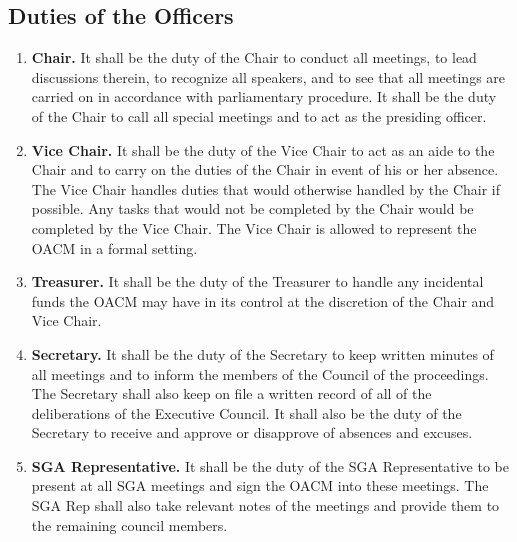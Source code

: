 \documentclass[letterpaper, 12pt]{article}
\begin{document}
\subsection{Duties of the Officers}
\begin{enumerate}
    \item \textbf{Chair.}  It shall be the duty of the Chair to conduct all 
        meetings, to lead discussions therein, to recognize all speakers, 
        and to see that all meetings are carried on in accordance with 
        parliamentary procedure.  
        It shall be the duty of the Chair to call all special meetings 
        and to act as the presiding officer.
    \item \textbf{Vice Chair.} It shall be the duty of the Vice Chair to act 
        as an aide to the Chair and to carry on the duties of the Chair in 
        event of his or her absence.  
        The Vice Chair handles duties that would otherwise handled by the 
        Chair if possible. 
        Any tasks that would not be completed by the Chair would be completed 
        by the Vice Chair. 
        The Vice Chair is allowed to represent the OACM in a formal setting.
    \item \textbf{Treasurer.} It shall be the duty of the Treasurer to 
        handle any incidental funds the OACM may have in its control at the 
        discretion of the Chair and Vice Chair.
    \item \textbf{Secretary.} It shall be the duty of the Secretary to keep 
        written minutes of all meetings and to inform the members of the 
        Council of the proceedings.  
        The Secretary shall also keep on file a written record of all of the 
        deliberations of the Executive Council.  
        It shall also be the duty of the Secretary to receive and approve or 
        disapprove of absences and excuses.
    \item \textbf{SGA Representative.} It shall be the duty of the SGA 
        Representative to be present at all SGA meetings and sign the OACM 
        into these meetings. 
        The SGA Rep shall also take relevant notes of the meetings and 
        provide them to the remaining council members.
\end{enumerate}
\end{document}
